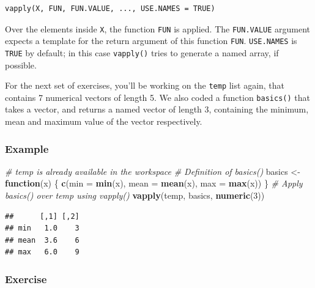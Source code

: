 \documentclass[
]{book}
\newenvironment{Shaded}{\begin{snugshade}}{\end{snugshade}}
\newcommand{\CommentTok}[1]{\textcolor[rgb]{0.56,0.35,0.01}{\textit{#1}}}
\newcommand{\ControlFlowTok}[1]{\textcolor[rgb]{0.13,0.29,0.53}{\textbf{#1}}}
\newcommand{\DataTypeTok}[1]{\textcolor[rgb]{0.13,0.29,0.53}{#1}}
\newcommand{\DecValTok}[1]{\textcolor[rgb]{0.00,0.00,0.81}{#1}}
\newcommand{\KeywordTok}[1]{\textcolor[rgb]{0.13,0.29,0.53}{\textbf{#1}}}
\newcommand{\NormalTok}[1]{#1}
\newcommand{\StringTok}[1]{\textcolor[rgb]{0.31,0.60,0.02}{#1}}
\begin{document}
\begin{verbatim}
vapply(X, FUN, FUN.VALUE, ..., USE.NAMES = TRUE)
\end{verbatim}

Over the elements inside \texttt{X}, the function \texttt{FUN} is applied. The \texttt{FUN.VALUE} argument expects a template for the return argument of this function \texttt{FUN}. \texttt{USE.NAMES} is \texttt{TRUE} by default; in this case \texttt{vapply()} tries to generate a named array, if possible.

For the next set of exercises, you'll be working on the \texttt{temp} list again, that contains 7 numerical vectors of length 5. We also coded a function \texttt{basics()} that takes a vector, and returns a named vector of length 3, containing the minimum, mean and maximum value of the vector respectively.

\hypertarget{example-6}{%
\subsubsection{Example}\label{example-6}}

\begin{Shaded}
\begin{Highlighting}[]
\CommentTok{# temp is already available in the workspace}
\CommentTok{# Definition of basics()}
\NormalTok{basics <-}\StringTok{ }\ControlFlowTok{function}\NormalTok{(x) \{}
  \KeywordTok{c}\NormalTok{(}\DataTypeTok{min =} \KeywordTok{min}\NormalTok{(x), }\DataTypeTok{mean =} \KeywordTok{mean}\NormalTok{(x), }\DataTypeTok{max =} \KeywordTok{max}\NormalTok{(x))}
\NormalTok{\}}
\CommentTok{# Apply basics() over temp using vapply()}
\KeywordTok{vapply}\NormalTok{(temp, basics, }\KeywordTok{numeric}\NormalTok{(}\DecValTok{3}\NormalTok{))}
\end{Highlighting}
\end{Shaded}

\begin{verbatim}
##      [,1] [,2]
## min   1.0    3
## mean  3.6    6
## max   6.0    9
\end{verbatim}

\hypertarget{exercise-2}{%
\subsubsection{Exercise}\label{exercise-2}}
\end{document}
